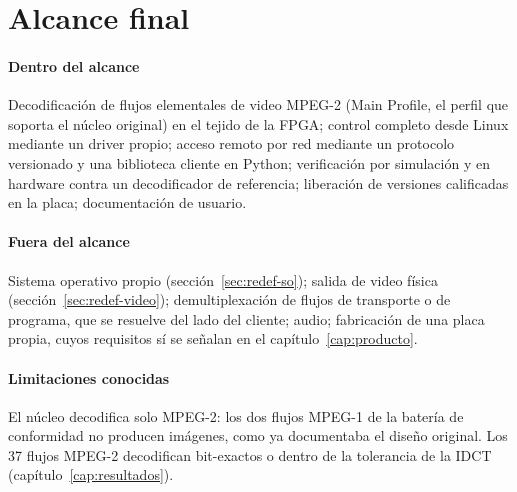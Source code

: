 \section{Alcance final}

\paragraph{Dentro del alcance}
Decodificación de flujos elementales de video MPEG-2 (Main Profile, el perfil
que soporta el núcleo original) en el tejido de la FPGA; control completo
desde Linux mediante un driver propio; acceso remoto por red mediante un
protocolo versionado y una biblioteca cliente en Python; verificación por
simulación y en hardware contra un decodificador de referencia; liberación de
versiones calificadas en la placa; documentación de usuario.

\paragraph{Fuera del alcance}
Sistema operativo propio (sección~\ref{sec:redef-so}); salida de video
física (sección~\ref{sec:redef-video}); demultiplexación de flujos de
transporte o de programa, que se resuelve del lado del cliente; audio;
fabricación de una placa propia, cuyos requisitos sí se señalan en el
capítulo~\ref{cap:producto}.

\paragraph{Limitaciones conocidas}
El núcleo decodifica solo MPEG-2: los dos flujos MPEG-1 de la batería de
conformidad no producen imágenes, como ya documentaba el diseño original. Los
37 flujos MPEG-2 decodifican bit-exactos o dentro de la tolerancia de la IDCT
(capítulo~\ref{cap:resultados}).
